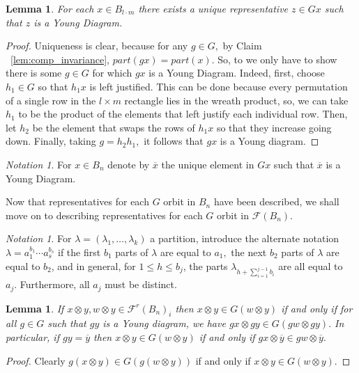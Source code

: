 \documentclass{amsart}
\newtheorem{lem}[thm]{Lemma}
\theoremstyle{remark}
\newtheorem{note}[thm]{Notation}
\begin{document}
\begin{lem}
\label{lem:young_diag_reps}
For each $x \in B_{l\cdot m}$ there exists a unique representative $z \in Gx$ such that $z$ is a Young Diagram.
\end{lem}
\begin{proof}
Uniqueness is clear, because for any $g \in G,$ by Claim ~\ref{lem:comp_invariance}, $part(gx) = part(x).$ So, to we only have to show there is some $g \in G$ for which $gx$ is a Young Diagram. Indeed, first, choose $h_1 \in G$ so that $h_1x$ is left justified. This can be done because every permutation of a single row in the $l\times m$ rectangle lies in the wreath product, so, we can take $h_1$ to be the product of the elements that left justify each individual row. Then, let $h_2$ be the element that swaps the rows of $h_1x$ so that they increase going down. Finally, taking $g = h_2 h_1,$ it follows that $gx$ is a Young diagram. 
\end{proof}

\begin{note}
For $x \in B_n$ denote by $\overline{x}$ the unique element in $Gx$ such that $\overline{x}$ is a Young Diagram.
\end{note}

Now that representatives for each $G$ orbit in $B_n$ have been described, we shall move on to describing representatives for each $G$ orbit in $\mathcal F(B_n).$

\begin{note}
For $\lambda = (\lambda_1,\ldots, \lambda_k)$ a partition, introduce the alternate notation $\lambda = a_1^{b_1} \cdots a_s^{b_s}$ if the first $b_1$ parts of $\lambda$ are equal to $a_1,$ the next $b_2$ parts of $\lambda$ are equal to $b_2$, and in general, for $1 \leq h\leq b_j$, the parts $ \lambda_{h+\sum_{i=1}^{j-1} b_i}$ are all equal to $a_j.$ Furthermore, all $a_j$ must be distinct.
\end{note}

\begin{lem}
\label{lem:young_diag_reduction}
If $x\otimes y, w \otimes y \in\mathcal F^r(B_n)_i$ then $x\otimes y \in G(w \otimes y)$ if and only if for all $g \in G$ such that $gy$ is a Young diagram, we have $gx \otimes gy \in G(gw \otimes gy).$ In particular, if $gy = \overline y$ then $x\otimes y \in G(w\otimes y)$ if and only if $gx \otimes \overline y \in gw \otimes \overline y.$
\end{lem}
\begin{proof}
Clearly $g(x\otimes y) \in G(g(w\otimes y))$ if and only if $x \otimes y \in G(w \otimes y).$
\end{proof}
\end{document}
